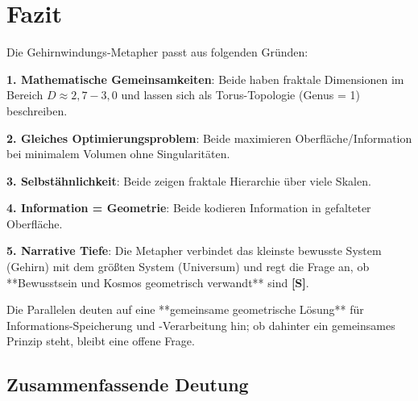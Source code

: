 	\section{Fazit}

	\begin{keyresult}
		Die Gehirnwindungs-Metapher passt aus folgenden Gründen:

		\vspace{0.3cm}

		\textbf{1. Mathematische Gemeinsamkeiten}:
		Beide haben fraktale Dimensionen im Bereich $D \approx 2,7 - 3,0$ und lassen sich als Torus-Topologie (Genus = 1) beschreiben.

		\vspace{0.3cm}

		\textbf{2. Gleiches Optimierungsproblem}:
		Beide maximieren Oberfläche/Information bei minimalem Volumen ohne Singularitäten.

		\vspace{0.3cm}

		\textbf{3. Selbstähnlichkeit}:
		Beide zeigen fraktale Hierarchie über viele Skalen.

		\vspace{0.3cm}

		\textbf{4. Information = Geometrie}:
		Beide kodieren Information in gefalteter Oberfläche.

		\vspace{0.3cm}

		\textbf{5. Narrative Tiefe}:
		Die Metapher verbindet das kleinste bewusste System (Gehirn) mit dem größten System (Universum) und regt die Frage an, ob **Bewusstsein und Kosmos geometrisch verwandt** sind \textbf{[S]}.

		\vspace{0.3cm}

		Die Parallelen deuten auf eine **gemeinsame geometrische Lösung** für Informations-Speicherung und -Verarbeitung hin; ob dahinter ein gemeinsames Prinzip steht, bleibt eine offene Frage.
	\end{keyresult}

	\subsection{Zusammenfassende Deutung}

